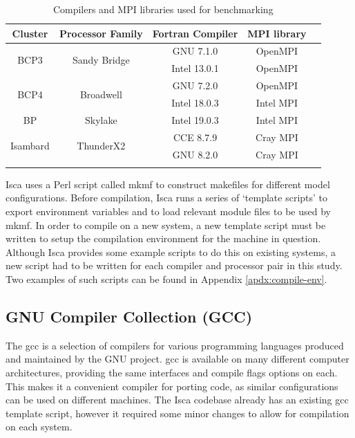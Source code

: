 \documentclass[a4paper,11pt]{report}
\begin{document}
\begin{table}[htp]
\caption{Compilers and MPI libraries used for benchmarking}
\begin{center}
\begin{tabular}{c c c c c}
 \toprule

\textbf{Cluster} 			&	\textbf{Processor Family}		&	\textbf{Fortran Compiler}		&	\textbf{MPI library}	 \\
\midrule
\multirow{2}{*}{BCP3} 	&	\multirow{2}{*}{Sandy Bridge}	&	GNU 7.1.0 			&	OpenMPI	 \\
					& 							& 	Intel 13.0.1			&	OpenMPI			\\
\midrule	
\multirow{2}{*}{BCP4}	&	\multirow{2}{*}{Broadwell}		&	GNU 7.2.0			&	OpenMPI			\\
	&											&	Intel 18.0.3			&	Intel MPI			\\
\midrule	
BP					&	Skylake					&	Intel 19.0.3 			&	Intel MPI			\\
\midrule			
\multirow{2}{*}{Isambard}	&	\multirow{2}{*}{ThunderX2}	&	CCE 8.7.9				&	Cray MPI			\\
					&							&	GNU 8.2.0			&	Cray MPI			\\
\bottomrule \\
\end{tabular}	
\end{center}
\label{tbl:compilers}
\end{table}%
\par
Isca uses a Perl script called \gls{mkmf} to construct makefiles for different model configurations. Before compilation, Isca runs a series of `template scripts' to export environment variables and to load relevant module files to be used by \gls{mkmf}. In order to compile on a new system, a new template script must be written to setup the compilation environment for the machine in question. Although Isca provides some example scripts to do this on existing systems, a new script had to be written for each compiler and processor pair in this study. Two examples of such scripts can be found in Appendix \ref{apdx:compile-env}.  

\subsection{GNU Compiler Collection (GCC)}
The \gls{gcc} is a selection of compilers for various programming languages produced and maintained by the GNU project. \gls{gcc} is available on many different computer architectures, providing the same interfaces and compile flags options on each. This makes it a convenient compiler for porting code, as similar configurations can be used on different machines. The Isca codebase already has an existing \gls{gcc} template script, however it required some minor changes to allow for compilation on each system. 
\end{document}
